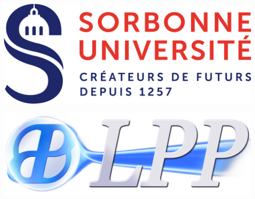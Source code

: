 \thispagestyle{empty}
\begin{center}
\begin{minipage}[l]{0.46\linewidth}
    \begin{flushleft}
	\includegraphics[height=0.3\linewidth]{Frontmatter/images/logo_SU.png}
  \end{flushleft}
\end{minipage}%
\begin{minipage}[r]{0.46\linewidth}
    \begin{flushright}
	\includegraphics[height=0.3\linewidth]{Frontmatter/images/logo_LPP.png}
  \end{flushright}
\end{minipage}%

\bigskip \bigskip \bigskip
\LARGE{\EAnom} \\
\large{\EDnom} \\
\textit{{\LABname}}\\
\textit{\LABequipe} \\

\bigskip %

\linia
\bigskip
\LARGE{\textbf{\titrefr}} \\
\Large{\textit{\soustitrefr}} \\
\bigskip
\linia


\end{center}
